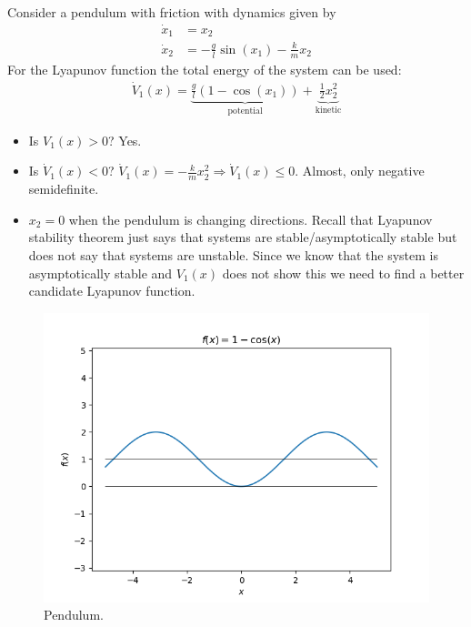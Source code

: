 \begin{example}
Consider a pendulum with friction with dynamics given by
\begin{align*}
\dot{x}_1 &= x_2 \\
\dot{x}_2 &= -\tfrac{g}{l}\sin(x_1) - \tfrac{k}{m}x_2
\end{align*}
For the Lyapunov function the total energy of the system can be used:
\begin{align*}
\dot{V}_1(x) = \underbrace{\tfrac{g}{l}(1-\cos(x_1))}_{\text{potential}} + \underbrace{\tfrac{1}{2}x_2^2}_{\text{kinetic}}
\end{align*}
\begin{itemize}
\item Is $V_1(x)>0$? Yes.
\item Is $\dot{V}_1(x)<0$? $\dot{V}_1(x) = -\tfrac{k}{m}x_2^2 \Rightarrow \dot{V}_1(x)\leq0$.
      Almost, only negative semidefinite.
\item $x_2=0$ when the pendulum is changing directions.
      Recall that Lyapunov stability theorem just says that systems are stable/asymptotically stable but does not say that systems are unstable.
      Since we know that the system is asymptotically stable and $V_1(x)$ does not show this we need to find a better candidate Lyapunov function.
\end{itemize}

\begin{figure}[ht!]
\centering
\includegraphics[width=.5\textwidth]{images/plot1minusCosX}
\caption{Pendulum.}%
\label{fig:plot1minusCosX}
\end{figure}


\end{example}
